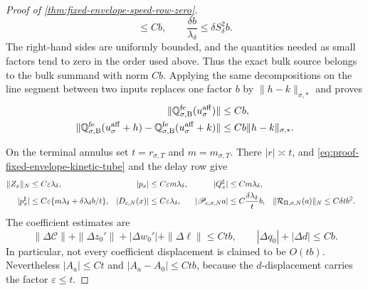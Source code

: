 \begin{proof}[Proof of
\cref{thm:fixed-envelope-speed-row-zero}]
\[ \le Cb,
 \qquad
 \frac{\delta b}{\lambda_\delta}
 \le \delta S_\delta^2b.
\]
The right-hand sides are uniformly bounded, and the quantities needed as
small factors tend to zero in the order used above.
Thus the exact bulk source belongs to the bulk summand with norm \(Cb\).
Applying the same decompositions on the line segment between two inputs
replaces one factor \(b\) by
\(\|h-k\|_{\sigma,*}\) and proves
\begin{align}
 \|\mathbb Q_{\sigma,\rm B}^{\rm fe}
       (u_\sigma^{\rm aff})\|&\le Cb,\notag\\
 \|\mathbb Q_{\sigma,\rm B}^{\rm fe}
       (u_\sigma^{\rm aff}+h)
  -\mathbb Q_{\sigma,\rm B}^{\rm fe}
       (u_\sigma^{\rm aff}+k)\|
 &\le Cb\|h-k\|_{\sigma,*}.                      \label{eq:proof-fixed-envelope-bulk-remainder}
\end{align}

On the terminal annulus set
\(t=r_{\sigma,T}\) and \(m=m_{\sigma,T}\).  There
\(|r|\asymp t\), and
\cref{eq:proof-fixed-envelope-kinetic-tube} and the delay row give
\begin{align}
 \|Z_x\|_N&\le C\varepsilon\lambda_\delta,&
 |p_x|&\le C\varepsilon m\lambda_\delta,&
 |Q_x^\sharp|&\le Cm\lambda_\delta,\notag\\
 |p_x^\sharp|&\le
   C\varepsilon\{m\lambda_\delta+
          \delta\lambda_\delta b/t\},&
 |D_{c,N}(x)|&\le C\varepsilon\lambda_\delta,&
 |\mathscr P_{c,\sigma,N}a|&\le
       C\frac{\delta\lambda_\delta}{t}b,&
 \|\mathcal R_{\Pi,\sigma,N}(a)\|_N
       &\le C\delta t b^2.                       \label{eq:proof-fixed-envelope-terminal-state-ledger}
\end{align}
The coefficient estimates are
\begin{equation}
 \|\Delta\mathcal C\|+\|\Delta z_0'\|
  +|\Delta w_0'|+\|\Delta\ell\|\le Ctb,\qquad
 |\Delta q_0|+|\Delta d|\le Cb.                 \label{eq:proof-fixed-envelope-terminal-coefficient-ledger}
\end{equation}
In particular, not every coefficient displacement is claimed to be
\(O(tb)\).  Nevertheless \(|A_a|\le Ct\) and
\(|A_a-A_0|\le Ctb\), because the \(d\)-displacement carries the factor
\(\varepsilon\le t\).


\end{proof}
